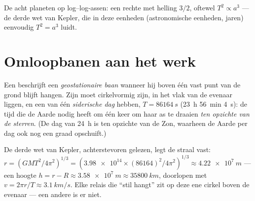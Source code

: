 \begin{omfigure}

{\small De acht planeten op log--log-assen: een rechte met helling $3/2$,
oftewel $T^2 \propto a^3$ --- de derde wet van Kepler, die in deze eenheden
(astronomische eenheden, jaren) eenvoudig $T^2 = a^3$ luidt.}
\end{omfigure}

\section{Omloopbanen aan het werk}

\begin{definition}\label{def:g12:satellites-kepler:geo}
Een  beschrijft een
\emph{geostationaire baan} wanneer hij boven één
vast punt van de grond blijft hangen. Zijn
 moet cirkelvormig zijn, in het vlak van de evenaar liggen, en een
 van één \emph{siderische dag} hebben,
$T = \qty{86164}{s}$ (\qty{23}{h} \qty{56}{min} \qty{4}{s}): de tijd die de
Aarde nodig heeft om één keer om haar as te draaien \emph{ten opzichte van
de sterren}. (De dag van \qty{24}{h} is ten opzichte van de Zon, waarheen de
Aarde per dag ook nog een graad opschuift.)
\end{definition}

\begin{example}\label{ex:g12:satellites-kepler:geoalt}
De derde wet van Kepler, achterstevoren gelezen, legt de straal vast:
$r = \left(GMT^2/4\pi^2\right)^{1/3} =
\left(\num{3.98e14} \times (\num{86164})^2/4\pi^2\right)^{1/3}
\approx \qty{4.22e7}{m}$ --- een hoogte $h = r - R \approx
\qty{3.58e7}{m} \approx \qty{35800}{km}$, doorlopen met $v = 2\pi r/T
\approx \qty{3.1}{km/s}$. Elke relais die ``stil hangt'' zit op deze ene
cirkel boven de evenaar --- een andere is er niet.
\end{example}

